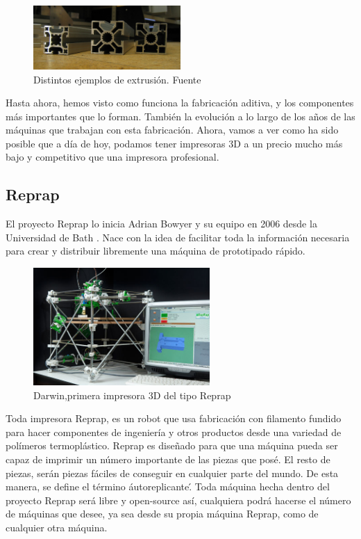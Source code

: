 \begin{itemize}
    \begin{figure}[H]
            \centering
            \includegraphics[width=0.5\textwidth]{images/Extruded_aluminium_section.jpg}
            \caption{Distintos ejemplos de extrusión. Fuente \cite{ejemplosextrusion}}
            \label{fig:estado_ejemplos}
    \end{figure}
\end{itemize}
Hasta ahora, hemos visto como funciona la fabricación aditiva, y los componentes más importantes que lo forman. También la evolución a lo largo de los años de las máquinas que trabajan con esta fabricación. Ahora, vamos a ver como ha sido posible que a día de hoy, podamos tener impresoras 3D a un precio mucho más bajo y competitivo que una impresora profesional.\\
\subsection{Reprap}
El proyecto Reprap lo inicia Adrian Bowyer y su equipo en 2006 desde la Universidad de Bath \cite{jones2011reprap}. Nace con la idea de facilitar toda la información necesaria para crear y distribuir libremente una máquina de prototipado rápido. 

\begin{figure}[H]
        \centering
        \includegraphics[width=0.6\textwidth]{images/darwin.jpg}
        \caption{Darwin,primera impresora 3D del tipo Reprap}
        \label{fig:estado_darwin}
\end{figure}

Toda impresora Reprap, es un robot que usa fabricación con filamento fundido para hacer componentes de ingeniería y otros productos desde una variedad de polímeros termoplástico. Reprap es diseñado para  que una máquina pueda ser capaz de imprimir un número importante de las piezas que posé. El resto de piezas, serán piezas fáciles de conseguir en cualquier parte del mundo. De esta manera, se define el término \'autoreplicante\'. Toda máquina hecha dentro del proyecto Reprap será libre y open-source así, cualquiera podrá hacerse el número de máquinas que desee, ya sea desde su propia máquina Reprap, como de cualquier otra máquina.\\

